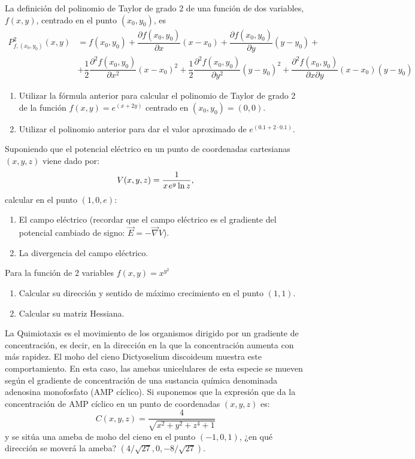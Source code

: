 {La definición del polinomio de Taylor de grado 2 de una función de dos variables, $f(x,y)$, centrado en el punto $(x_{0},y_{0})$, es
\begin{align*}
P_{f,(x_0,y_0)}^{2}(x,y)&= f(x_{0},y_{0})+\dfrac{\partial f(x_{0},y_{0})}{\partial x}(x-x_{0})+\dfrac{\partial f(x_{0},y_{0})}{\partial y}(y-y_{0})+\\
&+\dfrac{1}{2}\dfrac{\partial ^{2}f(x_{0},y_{0})}{\partial x^{2}}(x-x_{0})^{2}+\dfrac{1}{2}\dfrac{\partial ^{2}f(x_{0},y_{0})}{\partial y^{2}}(y-y_{0})^{2}+\dfrac{\partial ^{2}f(x_{0},y_{0})}{\partial x\partial y}(x-x_{0})(y-y_{0})
\end{align*}
\begin{enumerate}
\item  Utilizar la fórmula anterior para calcular el polinomio de Taylor de grado 2 de la función $f(x,y)=e^{(x+2y)}$ centrado en $(x_{0},y_{0})=(0,0)$.
\item  Utilizar el polinomio anterior para dar el valor aproximado de $e^{(0.1+2\cdot 0.1)}$.
\end{enumerate}
}


{Suponiendo que el potencial eléctrico en un punto de coordenadas cartesianas $(x,y,z)$ viene dado por:
\[
V(x,y,z) = \frac{1} {{x{\kern 1pt} e^y \ln z}},
\]
calcular en el punto $(1,0,e)$:
\begin{enumerate}
\item El campo eléctrico (recordar que el campo eléctrico es el gradiente del potencial cambiado de signo: $\vec E =  - \vec\nabla V$).
\item La divergencia del campo eléctrico.
\end{enumerate}
}


{Para la función de 2 variables $f(x,y) = x^{y^2}$
\begin{enumerate}
\item Calcular su dirección y sentido de máximo crecimiento en el punto $(1,1)$.
\item Calcular su matriz Hessiana.
\end{enumerate}
}


{La Quimiotaxis es el movimiento de los organismos dirigido por un gradiente de concentración, es decir, en la dirección
en la que la concentración aumenta con más rapidez. El moho del cieno Dictyoselium discoideum muestra este
comportamiento. En esta caso, las amebas unicelulares de esta especie se mueven según el gradiente de concentración de
una sustancia química denominada adenosina monofosfato (AMP cíclico). Si suponemos que la expresión que da la
concentración de AMP cíclico en un punto de coordenadas $(x,y,z)$ es:
\[
C(x,y,z) = \frac{4} {{\sqrt {x^2  + y^2  + z^4  + 1} }}
\]
y se sitúa una ameba de moho del cieno en el punto $(-1,0,1)$, ¿en qué dirección se moverá la ameba?
}
{$(4/\sqrt{27}, 0, -8/\sqrt{27})$.
}
{
}


